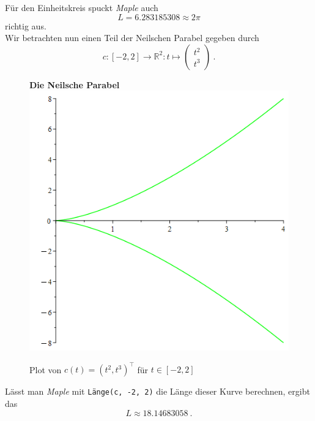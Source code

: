 \documentclass[12pt]{article}
\newenvironment{Fig}{\begin{figure}[H]
\begin{center}}{\end{center}\end{figure}}
\begin{document}
Für den Einheitskreis spuckt \textit{Maple} auch
\[L = 6.283185308 \approx 2 \pi\]
richtig aus.\\

Wir betrachten nun einen Teil der Neilschen Parabel gegeben durch
\[c: [-2,2] \rightarrow \mathbb{R}^2: t \mapsto \begin{pmatrix}
t^2 \\ t^3\end{pmatrix}~.\]

\begin{Fig}
\textbf{Die Neilsche Parabel}\\
\includegraphics[scale=0.25]{Kurve_Plot t^2, t^3.png}
\caption{Plot von $c(t) = \left(t^2, t^3\right)^\top$ für $t \in [-2,2]$}
\label{fig:Die Neilsche Parabel}
\end{Fig}

Lässt man \textit{Maple} mit \texttt{Länge(c, -2, 2)} die Länge dieser Kurve berechnen, ergibt das
\[L \approx 18.14683058~.\]
\end{document}
